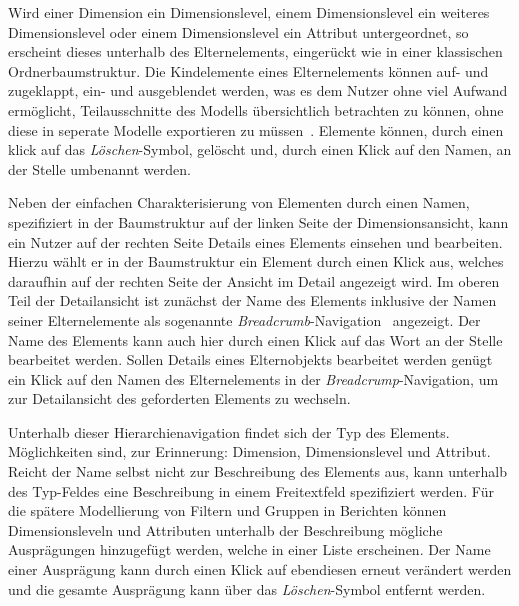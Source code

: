 \documentclass[
  language=german, %
  type=bachelor,%
  ngerman
]{isthesis}
\begin{document}
\begin{content}
  Wird einer Dimension ein Dimensionslevel, einem Dimensionslevel ein weiteres
  Dimensionslevel oder einem Dimensionslevel ein Attribut untergeordnet, so
  erscheint dieses unterhalb des Elternelements, eingerückt wie in einer
  klassischen Ordnerbaumstruktur. Die Kindelemente eines Elternelements können
  auf- und zugeklappt, \bzw{} ein- und ausgeblendet werden, was es dem Nutzer
  ohne viel Aufwand ermöglicht, Teilausschnitte des Modells übersichtlich
  betrachten zu können, ohne diese in seperate Modelle exportieren zu
  müssen~\cite[][S. 6 f.]{fleischer2013konstruktion}.  Elemente können, durch einen klick auf
  das \textit{Löschen}-Symbol, gelöscht und, durch einen Klick auf den Namen, an
  der Stelle umbenannt werden.

  Neben der einfachen Charakterisierung von Elementen durch einen Namen,
  spezifiziert in der Baumstruktur auf der linken Seite der Dimensionsansicht,
  kann ein Nutzer auf der rechten Seite Details eines Elements einsehen und
  bearbeiten.  Hierzu wählt er in der Baumstruktur ein Element durch einen
  Klick aus, welches daraufhin auf der rechten Seite der Ansicht im Detail
  angezeigt wird. Im oberen Teil der Detailansicht ist zunächst der Name des
  Elements inklusive der Namen seiner Elternelemente als sogenannte
  \textit{Breadcrumb}-Navigation~\cite[][S. 1316]{maldonado2002common}
  angezeigt.  Der Name des Elements kann auch hier durch einen Klick auf das
  Wort an der Stelle bearbeitet werden. Sollen Details eines Elternobjekts
  bearbeitet werden genügt ein Klick auf den Namen des Elternelements in der
  \textit{Breadcrump}-Navigation, um zur Detailansicht des geforderten Elements
  zu wechseln. 

  Unterhalb dieser Hierarchienavigation findet sich der Typ des Elements.
  Möglichkeiten sind, zur Erinnerung: Dimension, Dimensionslevel und Attribut.
  Reicht der Name selbst nicht zur Beschreibung des Elements aus, kann
  unterhalb des Typ-Feldes eine Beschreibung in einem Freitextfeld spezifiziert
  werden. Für die spätere Modellierung von Filtern und Gruppen in Berichten
  können Dimensionsleveln und Attributen unterhalb der Beschreibung mögliche
  Ausprägungen hinzugefügt werden, welche in einer Liste erscheinen. Der Name
  einer Ausprägung kann durch einen Klick auf ebendiesen erneut verändert
  werden und die gesamte Ausprägung kann über das
  \textit{Löschen}-Symbol entfernt werden.


\end{content}
\end{document}
